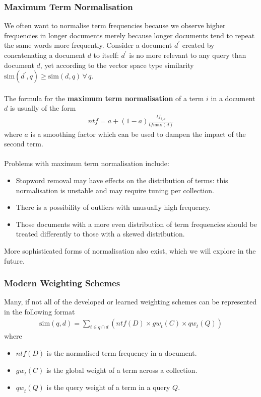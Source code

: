 \documentclass[a4paper,11pt]{article}
\begin{document}
\subsubsection{Maximum Term Normalisation}
We often want to normalise term frequencies because we observe higher frequencies in longer documents merely because longer documents tend to repeat the same words more frequently.
Consider a document $d^\prime$ created by concatenating a document $d$ to itself:
$d^\prime$  is no more relevant to any query than document $d$, yet according to the vector space type similarity $\text{sim}(d^\prime, q) \geq \text{sim}(d,q) \, \forall \, q$.
\\\\
The formula for the \textbf{maximum term normalisation} of a term $i$ in a document $d$ is usually of the form
\begin{align*}
\textit{ntf} = a + \left( 1 - a \right) \frac{\textit{tf}_{i,d}}{\textit{tf}\text{max}(d)}
\end{align*}
where $a$ is a smoothing factor which can be used to dampen the impact of the second term.
\\\\
Problems with maximum term normalisation include:
\begin{itemize}
    \item   Stopword removal may have effects on the distribution of terms: this normalisation is unstable and may require tuning per collection.
    \item   There is a possibility of outliers with unusually high frequency.
    \item   Those documents with a more even distribution of term frequencies should be treated differently to those with a skewed distribution.
\end{itemize}

More sophisticated forms of normalisation also exist, which we will explore in the future.

\subsubsection{Modern Weighting Schemes}
Many, if not all of the developed or learned weighting schemes can be represented in the following format
\begin{align*}
    \text{sim}(q,d) = \sum_{t \in q \cap d} \left( \textit{ntf}(D) \times \textit{gw}_t(C) \times \textit{qw}_t(Q) \right)
\end{align*}
where 
\begin{itemize}
    \item   $\textit{ntf}(D)$ is the normalised term frequency in a document.
    \item   $\textit{gw}_t(C)$ is the global weight of a term across a collection.
    \item   $\textit{qw}_t(Q)$ is the query weight of a term in a query $Q$.
\end{itemize}
\end{document}
